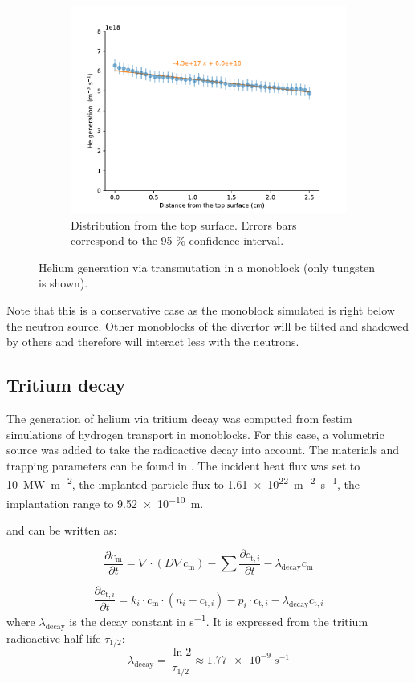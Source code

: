 \begin{figure}
\begin{subfigure}{1\linewidth}
        \includegraphics[width=0.6\linewidth]{Figures/Chapter5/he_generation_distribution.pdf}
        \caption{Distribution from the top surface. Errors bars correspond to the 95 \% confidence interval.}
    \end{subfigure}
    \caption{Helium generation via transmutation in a \gls{monoblock} (only tungsten is shown).}
\end{figure}

Note that this is a conservative case as the \gls{monoblock} simulated is right below the neutron source.
Other \glspl{monoblock} of the \gls{divertor} will be tilted and shadowed by others and therefore will interact less with the neutrons.


\subsection{Tritium decay}

The generation of helium via tritium decay was computed from \gls{festim} simulations of hydrogen transport in \glspl{monoblock}.
For this case, a volumetric source was added to take the radioactive decay into account.
The materials and trapping parameters can be found in .
The incident heat flux was set to \SI{10}{MW.m^{-2}}, the implanted particle flux to \SI{1.61e22}{m^{-2}.s^{-1}}, the implantation range to \SI{9.52e-10}{m}.

 and  can be written as:

\begin{equation}
    \frac{\partial c_\mathrm{m}}{\partial t}=\nabla \cdot (D \nabla c_\mathrm{m} ) -\sum \frac{\partial c_{\mathrm{t}, i}}{\partial t} - \lambda_\mathrm{decay} c_\mathrm{m}
\end{equation}

\begin{equation}
    \frac{\partial c_{\mathrm{t}, i}}{\partial t}=k_i \cdot c_\mathrm{m} \cdot\left(n_{i}-c_{\mathrm{t}, i}\right)-p_i \cdot c_{\mathrm{t}, i} - \lambda_\mathrm{decay} c_{\mathrm{t}, i}
\end{equation}
where $\lambda_\mathrm{decay}$ is the decay constant in \si{s^{-1}}.
It is expressed from the tritium radioactive half-life $\tau_{1/2}$:
\begin{equation}
    \lambda_\mathrm{decay} = \frac{\ln 2}{\tau_{1/2}} \approx \SI{1.77e-9}{s^{-1}}
\end{equation}

